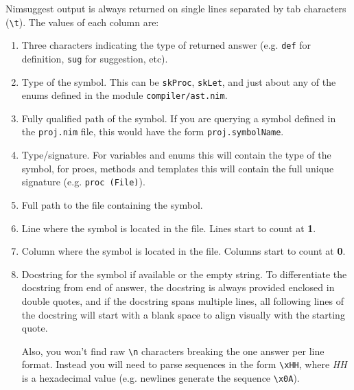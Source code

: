 Nimsuggest output is always returned on single lines separated by tab
characters (\texttt{\textbackslash{}t}). The values of each column are:

\begin{enumerate}
\def\labelenumi{\arabic{enumi}.}
\item
  Three characters indicating the type of returned answer (e.g.
  \texttt{def} for definition, \texttt{sug} for suggestion, etc).
\item
  Type of the symbol. This can be \texttt{skProc}, \texttt{skLet}, and
  just about any of the enums defined in the module
  \texttt{compiler/ast.nim}.
\item
  Fully qualified path of the symbol. If you are querying a symbol
  defined in the \texttt{proj.nim} file, this would have the form
  \texttt{proj.symbolName}.
\item
  Type/signature. For variables and enums this will contain the type of
  the symbol, for procs, methods and templates this will contain the
  full unique signature (e.g. \texttt{proc\ (File)}).
\item
  Full path to the file containing the symbol.
\item
  Line where the symbol is located in the file. Lines start to count at
  \textbf{1}.
\item
  Column where the symbol is located in the file. Columns start to count
  at \textbf{0}.
\item
  Docstring for the symbol if available or the empty string. To
  differentiate the docstring from end of answer, the docstring is
  always provided enclosed in double quotes, and if the docstring spans
  multiple lines, all following lines of the docstring will start with a
  blank space to align visually with the starting quote.

  Also, you won't find raw \texttt{\textbackslash{}n} characters
  breaking the one answer per line format. Instead you will need to
  parse sequences in the form \texttt{\textbackslash{}xHH}, where
  \emph{HH} is a hexadecimal value (e.g. newlines generate the sequence
  \texttt{\textbackslash{}x0A}).
\end{enumerate}

